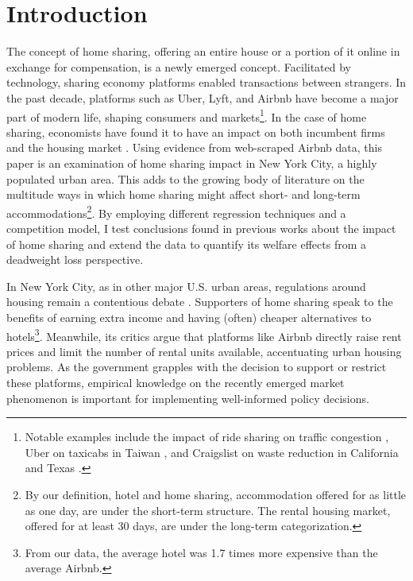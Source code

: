 \documentclass[12pt]{article}
\begin{document}
	\section{Introduction}  %
		The concept of home sharing, offering an entire house or a portion of it online in exchange for compensation, is a newly emerged concept. Facilitated by technology, sharing economy platforms enabled transactions between strangers. In the past decade, platforms such as Uber, Lyft, and Airbnb have become a major part of modern life, shaping consumers and markets\footnote{Notable examples include the impact of ride sharing on traffic congestion \citep{li2016ride}, Uber on taxicabs in Taiwan \citep{chang2017economic}, and Craigslist on waste reduction in California and Texas \citep{fremstad2017does}.}. In the case of home sharing, economists have found it to have an impact on both incumbent firms \citep{zervas2017rise, farronato2018welfare} and the housing market \citep{horn2017home, barron2018sharing}. Using evidence from web-scraped Airbnb data, this paper is an examination of home sharing impact in New York City, a highly populated urban area. This adds to the growing body of literature on the multitude ways in which home sharing might affect short- and long-term accommodations\footnote{By our definition, hotel and home sharing, accommodation offered for as little as one day, are under the short-term structure. The rental housing market, offered for at least 30 days, are under the long-term categorization.}. By employing different regression techniques and a competition model, I test conclusions found in previous works about the impact of home sharing and extend the data to quantify its welfare effects from a deadweight loss perspective.
		
		\par
		In New York City, as in other major U.S. urban areas, regulations around housing remain a contentious debate \citep{weiser2019judge, said2018leaner}. Supporters of home sharing speak to the benefits of earning extra income and having (often) cheaper alternatives to hotels\footnote{From our data, the average hotel was 1.7 times more expensive than the average Airbnb.}. Meanwhile, its critics argue that platforms like Airbnb directly raise rent prices and limit the number of rental units available, accentuating urban housing problems. As the government grapples with the decision to support or restrict these platforms, empirical knowledge on the recently emerged market phenomenon is important for implementing well-informed policy decisions.
		
\end{document}
